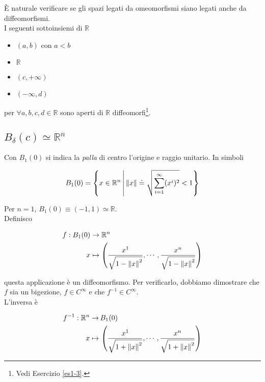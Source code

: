 \`{E} naturale verificare se gli spazi legati da omeomorfismi siano legati anche da diffeomorfismi.\\
I seguenti sottoinsiemi di $ \mathbb{R} $

\begin{itemize}
	\item $ (a,b) $ con $ a<b $
	
	\item $ \mathbb{R} $
	
	\item $ (c, + \infty) $
	
	\item $ (- \infty, d) $
\end{itemize}

per  $ \forall a,b,c,d \in \mathbb{R} $ sono aperti di $ \mathbb{R} $ diffeomorfi\footnote{%
	Vedi Esercizio \ref{es1-3}.%
}.

\subsection{$ B_{\delta} (c) \simeq \mathbb{R}^{n} $}

Con $ B_{1} (0) $ si indica la \textit{palla} di centro l'origine e raggio unitario. In simboli

\begin{equation}
	B_{1} (0) = \left\{ x \in \mathbb{R}^{n} \, \middle| \, \norm{x} \doteq \sqrt{\sum_{i=1}^{\infty} (x^{i})^{2}} < 1 \right\}
\end{equation}

Per $ n=1 $, $ B_{1} (0) \equiv (-1,1) \simeq \mathbb{R} $.\\
Definisco

\begin{align}
	\begin{split}
		f : B_{1} (0) &\to \mathbb{R}^{n}\\
		x &\mapsto \left( \dfrac{x^{1}}{\sqrt{1 - \norm{x}^{2}}}, \cdots, \dfrac{x^{n}}{\sqrt{1 - \norm{x}^{2}}} \right)
	\end{split}	
\end{align}

questa applicazione è un diffeomorfismo. Per verificarlo, dobbiamo dimostrare che $ f $ sia un bigezione, $ f \in C^{\infty} $ e che $ f^{-1} \in C^{\infty} $.\\
L'inversa è

\begin{align}
	\begin{split}
		f^{-1} : \mathbb{R}^{n} \to& \, B_{1} (0)\\
		x \mapsto& \, \left( \dfrac{x^{1}}{\sqrt{1 + \norm{x}^{2}}}, \cdots, \dfrac{x^{n}}{\sqrt{1 + \norm{x}^{2}}} \right)
	\end{split}
\end{align}

